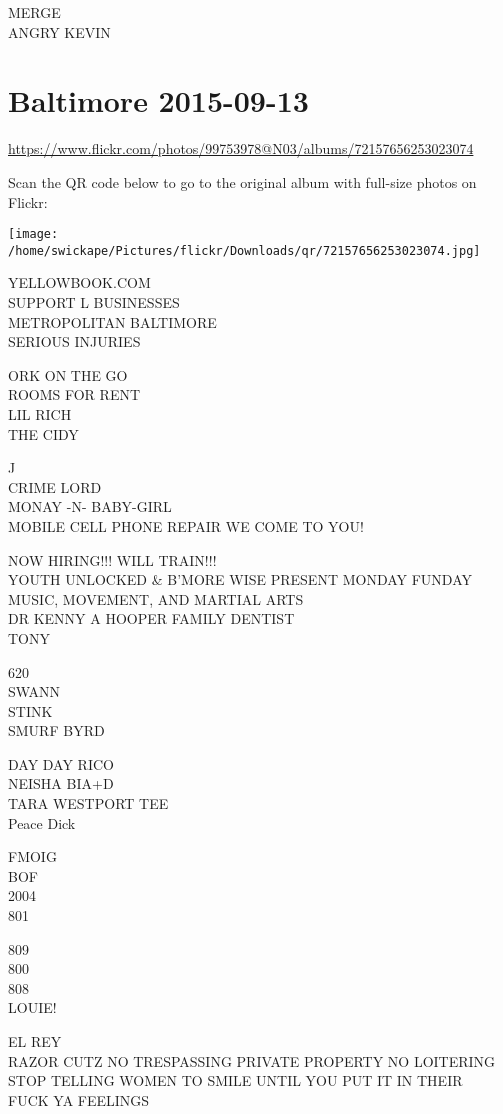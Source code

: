 \documentclass[10pt,letterpaper]{article}
\begin{document}
MERGE\\
ANGRY KEVIN


\section*{Baltimore 2015-09-13}

\url{https://www.flickr.com/photos/99753978@N03/albums/72157656253023074}

Scan the QR code below to go to the original album with full-size photos on Flickr:

\texttt{[image: /home/swickape/Pictures/flickr/Downloads/qr/72157656253023074.jpg]}


YELLOWBOOK.COM\\
SUPPORT L BUSINESSES\\
METROPOLITAN BALTIMORE\\
SERIOUS INJURIES

ORK ON THE GO\\
ROOMS FOR RENT\\
LIL RICH\\
THE CIDY

J\\
CRIME LORD\\
MONAY {-}N{-} BABY{-}GIRL\\
MOBILE CELL PHONE REPAIR WE COME TO YOU!

NOW HIRING!!! WILL TRAIN!!!\\
YOUTH UNLOCKED \& B'MORE WISE PRESENT MONDAY FUNDAY MUSIC, MOVEMENT, AND MARTIAL ARTS\\
DR KENNY A HOOPER FAMILY DENTIST\\
TONY

620\\
SWANN\\
STINK\\
SMURF BYRD

DAY DAY RICO\\
NEISHA BIA+D\\
TARA WESTPORT TEE\\
Peace Dick

FMOIG\\
BOF\\
2004\\
801

809\\
800\\
808\\
LOUIE!

EL REY\\
RAZOR CUTZ NO TRESPASSING PRIVATE PROPERTY NO LOITERING\\
STOP TELLING WOMEN TO SMILE UNTIL YOU PUT IT IN THEIR\\
FUCK YA FEELINGS
\end{document}
